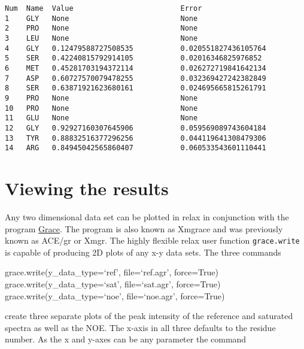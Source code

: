{\footnotesize \begin{verbatim}
Num  Name  Value                         Error
1    GLY   None                          None
2    PRO   None                          None
3    LEU   None                          None
4    GLY   0.12479588727508535           0.020551827436105764
5    SER   0.42240815792914105           0.02016346825976852
6    MET   0.45281703194372114           0.026272719841642134
7    ASP   0.60727570079478255           0.032369427242382849
8    SER   0.63871921623680161           0.024695665815261791
9    PRO   None                          None
10   PRO   None                          None
11   GLU   None                          None
12   GLY   0.92927160307645906           0.059569089743604184
13   TYR   0.88832516377296256           0.044119641308479306
14   ARG   0.84945042565860407           0.060533543601110441
\end{verbatim}}




\section{Viewing the results}

Any two dimensional data set can be plotted in relax in conjunction with the program \href{http://plasma-gate.weizmann.ac.il/Grace/}{Grace}.  The program is also known as Xmgrace and was previously known as ACE/gr or Xmgr.  The highly flexible relax user function \texttt{grace.write} is capable of producing 2D plots of any x-y data sets.  The three commands

\begin{exampleenv}
grace.write(y\_data\_type=`ref', file=`ref.agr', force=True) \\
grace.write(y\_data\_type=`sat', file=`sat.agr', force=True) \\
grace.write(y\_data\_type=`noe', file=`noe.agr', force=True)
\end{exampleenv}

create three separate plots of the peak intensity of the reference and saturated spectra as well as the NOE.  The x-axis in all three defaults to the residue number.  As the x and y-axes can be any parameter the command


